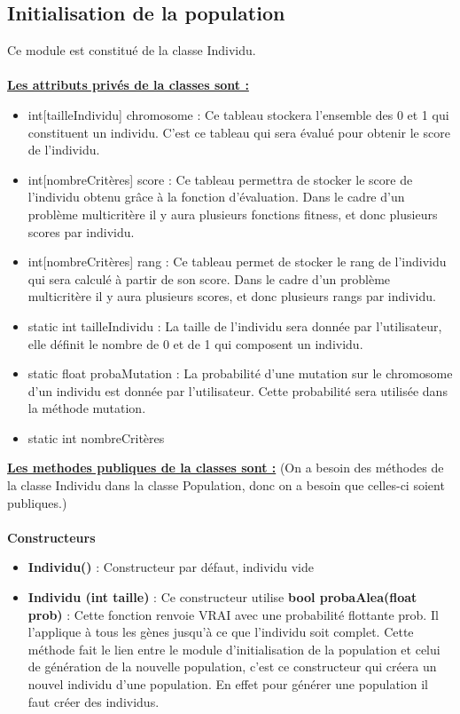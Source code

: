 \documentclass[a4paper,11pt]{article}
\begin{document}
		\subsection{Initialisation de la population}
			Ce module est constitué de la classe Individu.\\
			\\
			\underline{\bf Les attributs privés de la classes sont :}\\
				\begin{itemize}
				\item int[tailleIndividu] chromosome : Ce tableau stockera l’ensemble des 0 et 1 qui constituent un individu. C’est ce tableau qui sera évalué pour obtenir le score de l’individu.
				\item int[nombreCritères] score : Ce tableau permettra de stocker le score de l’individu obtenu grâce à la fonction d’évaluation. 
													Dans le cadre d’un problème multicritère il y aura plusieurs fonctions fitness, et donc plusieurs scores par individu.
				\item int[nombreCritères] rang : Ce tableau permet de stocker le rang de l’individu qui sera calculé à partir de son score. 
													Dans le cadre d’un problème multicritère il y aura plusieurs scores, et donc plusieurs rangs par individu. 
				\item static int tailleIndividu : La taille de l’individu sera donnée par l’utilisateur, elle définit le nombre de 0 et de 1 qui composent un individu.
				\item static float probaMutation : La probabilité d’une mutation sur le chromosome d’un individu est donnée par l’utilisateur. Cette probabilité sera utilisée dans la méthode mutation.
				\item static int nombreCritères\\
			\end{itemize}
			\underline{\bf Les methodes publiques de la classes sont :} (On a besoin des méthodes de la classe Individu dans la classe Population, donc on a besoin que celles-ci soient publiques.)\\\\
			\textbf{Constructeurs}
				\begin{itemize}
					\item \textbf{Individu()} : Constructeur par défaut, individu vide
					\item \textbf{Individu (int taille)} : Ce constructeur utilise \textbf{bool probaAlea(float prob)} : Cette fonction renvoie VRAI avec une probabilité flottante prob.
						Il l’applique à tous les gènes jusqu’à ce que l’individu soit complet.
						Cette méthode fait le lien entre le module d’initialisation de la population et celui de génération de la nouvelle population, c'est ce constructeur qui créera un nouvel individu d'une population. 
						En effet pour générer une population il faut créer des individus. \\
				\end{itemize}
\end{document}
